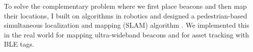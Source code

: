 \documentclass[10pt]{article}
\begin{document}
To solve the complementary problem where we first place beacons and then map their locations, I built on algorithms in robotics and designed a pedestrian-based simultaneous localization and mapping (SLAM) algorithm \cite{mobileAR}. We implemented this in the real world for mapping ultra-wideband beacons and for asset tracking with BLE tags. 



\end{document}
